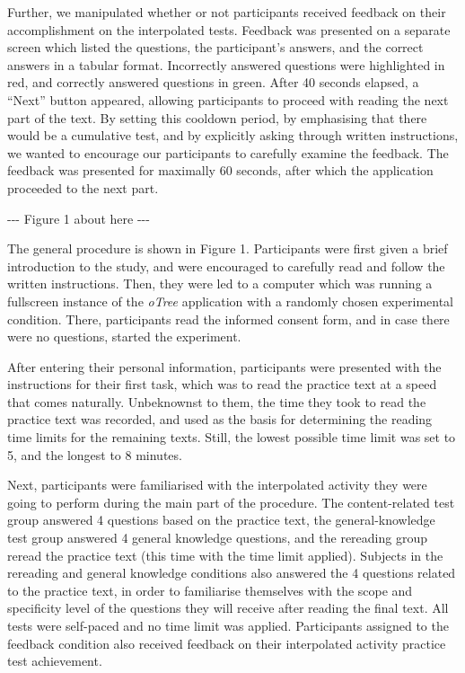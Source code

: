 Further, we manipulated whether or not participants received feedback on
their accomplishment on the interpolated tests. Feedback was presented
on a separate screen which listed the questions, the participant's
answers, and the correct answers in a tabular format. Incorrectly
answered questions were highlighted in red, and correctly answered
questions in green. After 40 seconds elapsed, a ``Next'' button
appeared, allowing participants to proceed with reading the next part of
the text. By setting this cooldown period, by emphasising that there
would be a cumulative test, and by explicitly asking through written
instructions, we wanted to encourage our participants to carefully
examine the feedback. The feedback was presented for maximally 60
seconds, after which the application proceeded to the next part.


\begin{center}
    -{}-{}- Figure 1 about here -{}-{}-
\end{center}

The general procedure is shown in Figure 1. Participants
were first given a brief introduction to the study, and were encouraged
to carefully read and follow the written instructions. Then, they were
led to a computer which was running a fullscreen instance of the
\textit{oTree} application with a randomly chosen experimental
condition. There, participants read the informed consent 
form, and in case there were no questions, started the 
experiment.

After entering their personal information, participants were presented
with the instructions for their first task, which was to read the
practice text at a speed that comes naturally. Unbeknownst to them, the time 
they took to read the practice text was recorded, and used as the basis for 
determining the reading time limits for the remaining texts. Still, the 
lowest possible time limit was set to 5, and the longest to 8 minutes.

Next, participants were familiarised with the interpolated activity they
were going to perform during the main part of the procedure. The
content-related test group answered 4 questions based on the practice
text, the general-knowledge test group answered 4 general knowledge
questions, and the rereading group reread the practice text (this time
with the time limit applied). Subjects in the rereading and general 
knowledge conditions also answered the 4 questions related to the
practice text, in order to familiarise themselves with the scope and
specificity level of the questions they will receive after reading the
final text. All tests were self-paced and no time limit was applied.
Participants assigned to the feedback condition also received feedback
on their interpolated activity practice test achievement.


